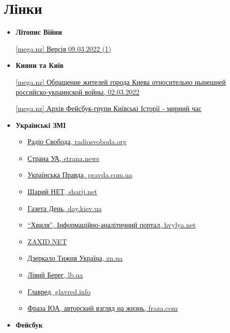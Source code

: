  
 
 
 
 
\section{Лінки}

\begin{itemize}
\item \textbf{Літопис Війни}

\href{https://mega.nz/file/08E1QARZ#lptMoRBsXDBuR_CLQ98Wr44fUBqcVqFDVfKB6FTzgw0}{%
[mega.nz] Версія 09.03.2022 (1)%
}

\item \textbf{Кияни та Київ}

\href{https://mega.nz/file/pk8QRCiQ#50ewDcF0CdtJ39XEnrc_zodA2fMqq7HGXTA1S7Httuw}{%
[mega.nz] Обращение жителей города Киева относительно нынешней российско-украинской войны, 02.03.2022}

\href{https://mega.nz/file/cltlFCgB#u_J6kOL2TxaLoKgXPKJdYTNpA7-PMcwKicPydJ3P-zk}{%
[mega.nz] Архів Фейсбук-групи Київські Історії - мирний час}

\item \textbf{Українські ЗМІ}

\begin{itemize}
\item \href{https://www.radiosvoboda.org}{Радіо Свобода, radiosvoboda.org}
\item \href{https://strana.news}{Страна УА, strana.news}
\item \href{https://www.pravda.com.ua}{Українська Правда, pravda.com.ua}
\item \href{https://sharij.net}{Шарий НЕТ, sharij.net}
\item \href{https://www.day.kiev.ua}{Газета День, day.kiev.ua}
\item \href{https://hvylya.net}{\enquote{Хвиля}, Інформаційно-аналітичний портал, hvylya.net}
\item \href{https://zaxid.net}{ZAXID.NET}
\item \href{https://zn.ua}{Дзеркало Тижня Україна, zn.ua}
\item \href{https://zn.ua}{Лівий Берег, lb.ua}
\item \href{https://glavred.info}{Главред, glavred.info}
\item \href{https://fraza.com}{Фраза ЮА, авторский взгляд на жизнь, fraza.com}
\end{itemize}

\item \textbf{Фейсбук}

\end{itemize}
